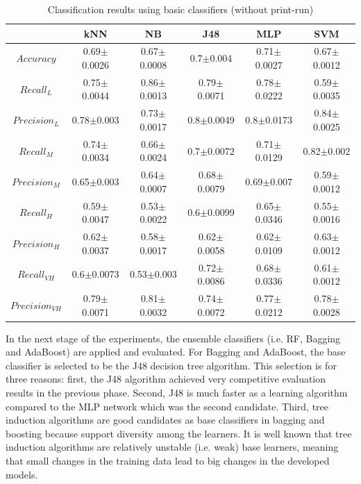 \documentclass[a4paper,10pt,onecolumn,preprint,3p]{elsarticle}
\begin{document}
\begin{table}
\caption{Classification results using basic classifiers (without print-run)}
\centering{}%
\begin{tabular}{|c|c|c|c|c|c|}
\hline 
 & kNN  & NB  & J48  & MLP  & SVM\tabularnewline
\hline 
\hline 
$Accuracy$  & 0.69$\pm$0.0026 & 0.67$\pm$0.0008 & 0.7$\pm$0.004 & 0.71$\pm$0.0027 & 0.67$\pm$0.0012\tabularnewline
\hline 
\hline 
$Recall_{L}$  & 0.75$\pm$0.0044 & 0.86$\pm$0.0013 & 0.79$\pm$0.0071 & 0.78$\pm$0.0222 & 0.59$\pm$0.0035\tabularnewline
\hline 
$Precision_{L}$  & 0.78$\pm$0.003 & 0.73$\pm$0.0017 & 0.8$\pm$0.0049 & 0.8$\pm$0.0173 & 0.84$\pm$0.0025\tabularnewline
\hline 
\hline 
$Recall_{M}$  & 0.74$\pm$0.0034 & 0.66$\pm$0.0024 & 0.7$\pm$0.0072 & 0.71$\pm$0.0129 & 0.82$\pm$0.002\tabularnewline
\hline 
$Precision_{M}$  & 0.65$\pm$0.003 & 0.64$\pm$0.0007 & 0.68$\pm$0.0079 & 0.69$\pm$0.007 & 0.59$\pm$0.0012\tabularnewline
\hline 
\hline 
$Recall_{H}$  & 0.59$\pm$0.0047 & 0.53$\pm$0.0022 & 0.6$\pm$0.0099 & 0.65$\pm$0.0346 & 0.55$\pm$0.0016\tabularnewline
\hline 
$Precision_{H}$  & 0.62$\pm$0.0037 & 0.58$\pm$0.0017 & 0.62$\pm$0.0058 & 0.62$\pm$0.0109 & 0.63$\pm$0.0012\tabularnewline
\hline 
\hline 
$Recall_{VH}$  & 0.6$\pm$0.0073 & 0.53$\pm$0.003 & 0.72$\pm$0.0086 & 0.68$\pm$0.0336 & 0.61$\pm$0.0012\tabularnewline
\hline 
$Precision_{VH}$  & 0.79$\pm$0.0071 & 0.81$\pm$0.0032 & 0.74$\pm$0.0072 & 0.77$\pm$0.0212 & 0.78$\pm$0.0028\tabularnewline
\hline 
\end{tabular}
\label{table:basic_classifiers}
\end{table}


In the next stage of the experiments, the ensemble classifiers (i.e. RF, Bagging and AdaBoost) are applied and evaluated. For Bagging and AdaBoost, the base classifier is selected to be the J48 decision tree algorithm. This selection is for three reasons: first, the J48 algorithm achieved very competitive evaluation results in the previous phase. Second, J48 is much faster as a learning algorithm compared to the MLP network which was the second candidate. Third, tree induction algorithms are good candidates as base classifiers in bagging and boosting because support diversity among the learners. It is well known that tree induction algorithms are relatively unstable (i.e. weak) base learners, meaning that small changes in the training data lead to big changes in the developed models. 
\end{document}

